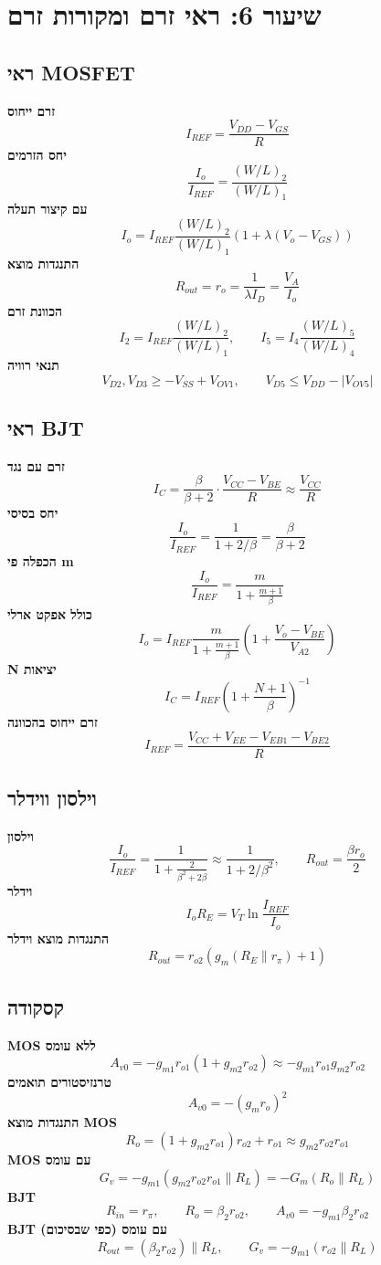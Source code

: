 \documentclass[11pt]{article}
\begin{document}
\section{שיעור 6: ראי זרם ומקורות זרם}
\subsection*{ראי MOSFET}
\textbf{זרם ייחוס}
\[I_{REF}=\frac{V_{DD}-V_{GS}}{R}\]
\textbf{יחס הזרמים}
\[\frac{I_o}{I_{REF}}=\frac{\left(W/L\right)_2}{\left(W/L\right)_1}\]
\textbf{עם קיצור תעלה}
\[I_o=I_{REF}\frac{\left(W/L\right)_2}{\left(W/L\right)_1}\left(1+\lambda\left(V_o-V_{GS}\right)\right)\]
\textbf{התנגדות מוצא}
\[R_{out}=r_o=\frac{1}{\lambda I_D}=\frac{V_A}{I_o}\]
\textbf{הכוונת זרם}
\[I_2=I_{REF}\frac{\left(W/L\right)_2}{\left(W/L\right)_1},\qquad I_5=I_4\frac{\left(W/L\right)_5}{\left(W/L\right)_4}\]
\textbf{תנאי רוויה}
\[V_{D2},V_{D3}\ge -V_{SS}+V_{OV1},\qquad V_{D5}\le V_{DD}-|V_{OV5}|\]
\subsection*{ראי BJT}
\textbf{זרם עם נגד}
\[I_C=\frac{\beta}{\beta+2}\cdot\frac{V_{CC}-V_{BE}}{R}\approx\frac{V_{CC}}{R}\]
\textbf{יחס בסיסי}
\[\frac{I_o}{I_{REF}}=\frac{1}{1+2/\beta}=\frac{\beta}{\beta+2}\]
\textbf{הכפלה פי m}
\[\frac{I_o}{I_{REF}}=\frac{m}{1+\frac{m+1}{\beta}}\]
\textbf{כולל אפקט ארלי}
\[I_o=I_{REF}\frac{m}{1+\frac{m+1}{\beta}}\left(1+\frac{V_o-V_{BE}}{V_{A2}}\right)\]
\textbf{N יציאות}
\[I_C=I_{REF}\left(1+\frac{N+1}{\beta}\right)^{-1}\]
\textbf{זרם ייחוס בהכוונה}
\[I_{REF}=\frac{V_{CC}+V_{EE}-V_{EB1}-V_{BE2}}{R}\]
\subsection*{וילסון ווידלר}
\textbf{וילסון}
\[\frac{I_o}{I_{REF}}=\frac{1}{1+\frac{2}{\beta^2+2\beta}}\approx\frac{1}{1+2/\beta^2},\qquad R_{out}=\frac{\beta r_o}{2}\]
\textbf{וידלר}
\[I_oR_E=V_T\ln\frac{I_{REF}}{I_o}\]
\textbf{התנגדות מוצא וידלר}
\[R_{out}=r_{o2}\left(g_m\left(R_E\parallel r_\pi\right)+1\right)\]
\subsection*{קסקודה}
\textbf{MOS ללא עומס}
\[A_{v0}=-g_{m1}r_{o1}\left(1+g_{m2}r_{o2}\right)\approx-g_{m1}r_{o1}g_{m2}r_{o2}\]
\textbf{טרנזיסטורים תואמים}
\[A_{v0}=-\left(g_mr_o\right)^2\]
\textbf{התנגדות מוצא MOS}
\[R_o=\left(1+g_{m2}r_{o1}\right)r_{o2}+r_{o1}\approx g_{m2}r_{o2}r_{o1}\]
\textbf{MOS עם עומס}
\[G_v=-g_{m1}\left(g_{m2}r_{o2}r_{o1}\parallel R_L\right)=-G_m\left(R_o\parallel R_L\right)\]
\textbf{BJT}
\[R_{in}=r_\pi,\qquad R_o=\beta_2r_{o2},\qquad A_{v0}=-g_{m1}\beta_2r_{o2}\]
\textbf{BJT עם עומס (כפי שבסיכום)}
\[R_{out}=\left(\beta_2r_{o2}\right)\parallel R_L,\qquad G_v=-g_{m1}\left(r_{o2}\parallel R_L\right)\]
\end{document}
